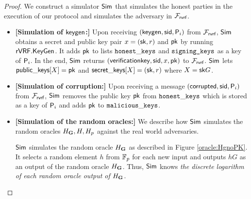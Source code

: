 \begin{proof}
	We construct a simulator $ \mathsf{Sim} $ that simulates the honest parties in the execution of our protocol and simulates the adversary in $ \mathcal{F}_{\textsf{rvrf}} $. 
	\begin{itemize}
		
		\item \textbf{[Simulation of $ \mathsf{keygen} $:]} Upon receiving $(\mathsf{keygen}, \textsf{sid}, \mathsf{P}_i)$ from $\mathcal{F}_{\textsf{rvrf}}$, $ \mathsf{Sim} $ obtains  a secret and public key pair $ x = (\mathsf{sk},r)$ and $\mathsf{pk} $ by running $ {\mathsf{rVRF}}.{\mathsf{KeyGen}} $. It adds $ \mathsf{pk} $ to lists $ \mathtt{honest\_keys} $ and $ \texttt{signing\_keys} $ as a key of $ \mathsf{P}_i $.
		In the end, $ \mathsf{Sim} $ returns $(\mathsf{verificationkey}, \textsf{sid}, x,\mathsf{pk})$ to $\mathcal{F}_{\textsf{rvrf}}$. 
	    $ \mathsf{Sim} $ lets $ {\mathsf{public\_keys}}[X] = \mathsf{pk}$ and $ {\mathsf{secret\_keys}}[X] =(\mathsf{sk},r) $ where $ X = \mathsf{sk} G $.
		
		\item \textbf{[Simulation of corruption:]} Upon receiving a message $ (\mathsf{corrupted}, \textsf{sid}, \mathsf{P}_i) $ from $ \mathcal{F}_{\textsf{rvrf}} $, $ \mathsf{Sim} $ removes the public key $ \mathsf{pk} $ from $ \mathtt{honest\_keys} $ which is stored as a key of $ \mathsf{P}_i $ and adds $ \mathsf{pk} $ to $ \mathtt{malicious\_keys} $.
		
		\item\textbf{[Simulation of the random oracles:]} We  describe how $ \mathsf{Sim} $ simulates the random oracles $ H_{\mathbf{G}}, H, H_p $ against the real world adversaries. 	
		
		$ \mathsf{Sim} $ simulates the random oracle $ H_{\mathbf{G}} $ as described in Figure \ref{oracle:HgnoPK}. It selects a random element  $ h $ from $ \mathbb{F}_p $ for each new input and outputs $ hG $ as an output of the random oracle $ H_{\mathbf{G}} $. Thus, $ \mathsf{Sim} $ knows \emph{the discrete logarithm of each random oracle output of $H_{\mathbf{G}}  $}. 



\end{itemize}
\end{proof}

